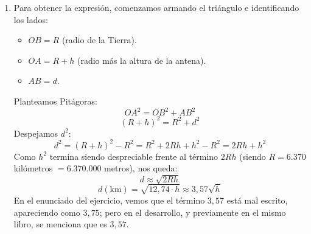 \documentclass[11pt,a4paper]{article}
\begin{document}
\begin{enumerate}[label=4.\arabic*), itemsep=0.3cm]
        Primero calculamos la pérdida de propagación en el espacio libre:

        \begin{equation}
          L_{\text{dB}}
          = 20\log_{10}\left(
          \frac{4\pi d_{\text{dist}}}{\lambda}
          \right)
        \end{equation}

        Reemplazando:

        \begin{equation}
          L_{\text{dB}}
          = 20\log_{10}\left(
          \frac{4\pi(24,000)}{0{,}15}
          \right)
          \approx 126{,}07,\text{dB}
        \end{equation}

        Finalmente, aplicamos el balance de enlace:

        \begin{equation}
          P_{r,\text{dBm}}
          = P_{t,\text{dBm}}
          + G_{t,\text{dB}}
          + G_{r,\text{dB}}
          - L_{\text{dB}}
        \end{equation}

        Como ambas antenas tienen la misma ganancia:

        \begin{equation}
          P_{r,\text{dBm}}
          = 20 + 25{,}49 + 25{,}49 - 126{,}07
          \approx -55{,}09,\text{dBm}
        \end{equation}

        Por lo tanto, la potencia de la señal a la salida de la antena receptora es aproximadamente $-55{,}09,\text{dBm}$.

  \item
        Para obtener la expresión, comenzamos armando el triángulo e identificando los lados:
        \begin{itemize}
          \item $OB = R$ (radio de la Tierra).
          \item $OA = R + h$ (radio más la altura de la antena).
          \item $AB = d$.
        \end{itemize}
        Planteamos Pitágoras:
        \[
          OA^2 = OB^2 + AB^2
        \]
        \[
          (R+h)^2 = R^2 + d^2
        \]
        Despejamos $d^2$:
        \[
          d^2 = (R+h)^2 - R^2 = R^2 + 2Rh + h^2 - R^2 = 2Rh + h^2
        \]
        Como $h^2$ termina siendo despreciable frente al término $2Rh$ (siendo $R = 6.370$ kilómetros $= 6.370.000$ metros), nos queda:
        \[
          d \approx \sqrt{2Rh}
        \]
        \[
          d(\mathrm{km}) = \sqrt{12,74\cdot h} \approx 3,57\sqrt{h}
        \]
        En el enunciado del ejercicio, vemos que el término $3,57$ está mal escrito, apareciendo como $3,75$; pero en el desarrollo, y previamente en el mismo libro, se menciona que es $3,57$.


\end{enumerate}
\end{document}
